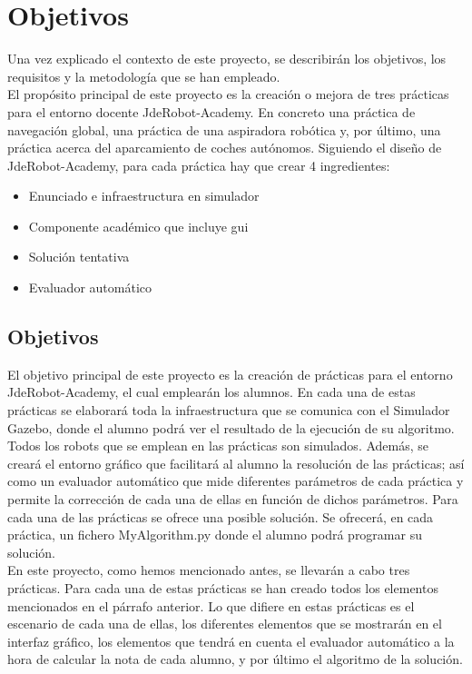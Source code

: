 \chapter{Objetivos}\label{cap.objetivos}
Una vez explicado el contexto de este proyecto, se describirán los objetivos, los requisitos y la metodología que se han empleado.\\

El propósito principal de este proyecto es la creación o mejora de tres prácticas para el entorno docente JdeRobot-Academy. En concreto una práctica de navegación global, una práctica de una aspiradora robótica y, por último, una práctica acerca del aparcamiento de coches autónomos. Siguiendo el diseño de JdeRobot-Academy, para cada práctica hay que crear 4 ingredientes:

\begin{itemize}
\item Enunciado e infraestructura en simulador
\item Componente académico que incluye \acrshort{gui}
\item Solución tentativa
\item Evaluador automático
\end{itemize}

\section{Objetivos}
El objetivo principal de este proyecto es la creación de prácticas para el entorno JdeRobot-Academy, el cual emplearán los alumnos. En cada una de estas prácticas se elaborará toda la infraestructura que se comunica con el Simulador Gazebo, donde el alumno podrá ver el resultado de la ejecución de su algoritmo. Todos los robots que se emplean en las prácticas son simulados. Además, se creará el entorno gráfico que facilitará al alumno la resolución de las prácticas; así como un evaluador automático que mide diferentes parámetros de cada práctica y permite la corrección de cada una de ellas en función de dichos parámetros. Para cada una de las prácticas se ofrece una posible solución. Se ofrecerá, en cada práctica, un fichero MyAlgorithm.py donde el alumno podrá programar su solución.\\

En este proyecto, como hemos mencionado antes, se llevarán a cabo tres prácticas. Para cada una de estas prácticas se han creado todos los elementos mencionados en el párrafo anterior. Lo que difiere en estas prácticas es el escenario de cada una de ellas, los diferentes elementos que se mostrarán en el interfaz gráfico, los elementos que tendrá en cuenta el evaluador automático a la hora de calcular la nota de cada alumno, y por último el algoritmo de la solución.\\

